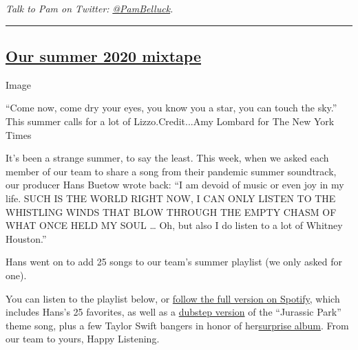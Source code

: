 \emph{Talk to Pam on Twitter:}
\href{https://twitter.com/pambelluck?lang=en}{\emph{@PamBelluck}}\emph{.}

\begin{center}\rule{0.5\linewidth}{\linethickness}\end{center}

\hypertarget{our-summer-2020-mixtape}{%
\subsection{\texorpdfstring{\href{https://open.spotify.com/playlist/0GvVwghTzyY4lR722dCeM0?si=xQezj1zNTeK1bSZriRY3zg}{Our
summer 2020
mixtape}}{Our summer 2020 mixtape}}\label{our-summer-2020-mixtape}}

Image

``Come now, come dry your eyes, you know you a star, you can touch the
sky.'' This summer calls for a lot of Lizzo.Credit...Amy Lombard for The
New York Times

It's been a strange summer, to say the least. This week, when we asked
each member of our team to share a song from their pandemic summer
soundtrack, our producer Hans Buetow wrote back: ``I am devoid of music
or even joy in my life. SUCH IS THE WORLD RIGHT NOW, I CAN ONLY LISTEN
TO THE WHISTLING WINDS THAT BLOW THROUGH THE EMPTY CHASM OF WHAT ONCE
HELD MY SOUL \ldots{} Oh, but also I do listen to a lot of Whitney
Houston.''

Hans went on to add 25 songs to our team's summer playlist (we only
asked for one).

You can listen to the playlist below, or
\href{https://open.spotify.com/playlist/0GvVwghTzyY4lR722dCeM0?si=SLnkYCqgRLaF-nUDcTHCFA}{follow
the full version on Spotify}, which includes Hans's 25 favorites, as
well as a \href{https://www.youtube.com/watch?v=fE0uc92JlCc}{dubstep
version} of the ``Jurassic Park'' theme song, plus a few Taylor Swift
bangers in honor of
her\href{https://www.nytimes3xbfgragh.onion/aponline/2020/07/23/us/ap-us-music-taylor-swift.html}{surprise
album}. From our team to yours, Happy Listening.


